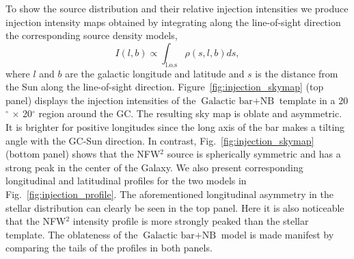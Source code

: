 \documentclass[doublespace,nopageskip]{VTthesis} %
\begin{document}

To show the source distribution and their relative injection intensities we produce injection intensity maps obtained by integrating along the line-of-sight direction the corresponding source density models,
\begin{equation}
  \label{eq:j_factor}
  I(l,b) \propto \int_{\text{l.o.s}} \rho(s,l,b) ds,
\end{equation}
where $l$ and $b$ are the galactic longitude and latitude and $s$ is the distance from the Sun along the line-of-sight direction.
Figure~\ref{fig:injection_skymap} (top panel) displays the injection intensities of the $\mbox{Galactic bar}+\mbox{NB}$ template in a 20$^\circ$ $\times$ 20$^\circ$ region around the GC. The resulting sky map is oblate and asymmetric. It is brighter for positive longitudes since the long axis of the bar makes a tilting angle with the GC-Sun direction. In contrast, Fig.~\ref{fig:injection_skymap} (bottom panel) shows that the NFW$^2$ source is spherically symmetric and has a strong peak in the center of the Galaxy. We also present corresponding longitudinal and latitudinal profiles for the two models in Fig.~\ref{fig:injection_profile}. The aforementioned longitudinal asymmetry in the stellar distribution can clearly be seen in the top panel. Here it is also noticeable that the NFW$^2$ intensity profile is more strongly peaked than the stellar template. The oblateness of the $\mbox{Galactic bar}+\mbox{NB}$ model is made manifest by comparing the tails of the profiles in both panels.
\end{document}
